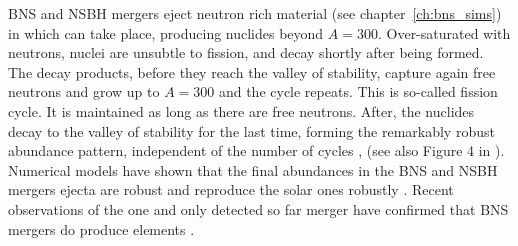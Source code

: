 \ac{BNS} and \ac{NSBH} mergers eject neutron rich material (see chapter~\ref{ch:bns_sims}) 
in which \rproc{} can take place, producing nuclides beyond $A=300$. Over-saturated with neutrons, nuclei 
are unsubtle to fission, and decay shortly after being formed. The decay products, before they reach the 
valley of stability, capture again free neutrons and grow up to $A=300$ and the cycle repeats. 
This is so-called fission cycle. 
It is maintained as long as there are free neutrons. After, the nuclides decay to the valley of 
stability for the last time, forming the remarkably robust abundance pattern, independent of the 
number of cycles \citep{Korobkin:2012uy,Bauswein:2013yna,Mendoza-Temis:2014mja}, 
(see also Figure 4 in \citet{Korobkin:2012uy}).
%
Numerical models have shown that the final \rproc{} abundances in the \ac{BNS} and \ac{NSBH} 
mergers ejecta are robust and reproduce the solar ones robustly 
\citep{Freiburghaus:1999,Goriely:2011vg,Goriely:2015fqa,Wanajo:2014wha,Just:2014fka,Radice:2016dwd}\red{[Refs]}. 
Recent observations of the one and only detected so far merger have confirmed that \ac{BNS} mergers do 
produce \rproc{} elements .


